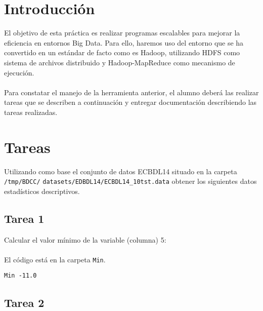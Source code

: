 \newpage %

\tableofcontents %


\newpage


\section{Introducción}

El objetivo de esta práctica es realizar programas escalables para mejorar la eficiencia en entornos Big Data. Para ello, haremos uso del entorno que se ha convertido en un estándar de facto como es Hadoop, utilizando HDFS como sistema de archivos distribuido y Hadoop-MapReduce como mecanismo de ejecución.
\\ \\
Para constatar el manejo de la herramienta anterior, el alumno deberá las realizar tareas que se describen a continuación y entregar documentación describiendo las tareas realizadas.

\section{Tareas}

Utilizando como base el conjunto de datos ECBDL14 situado en la carpeta \texttt{/tmp/BDCC/} \texttt{datasets/EDBDL14/ECBDL14\_10tst.data} obtener los siguientes datos estadísticos descriptivos.

\subsection{Tarea 1}

Calcular el valor mínimo de la variable (columna) 5:
\\ \\
El código está en la carpeta \texttt{Min}.

\begin{lstlisting}
Min -11.0
\end{lstlisting}

\subsection{Tarea 2}

